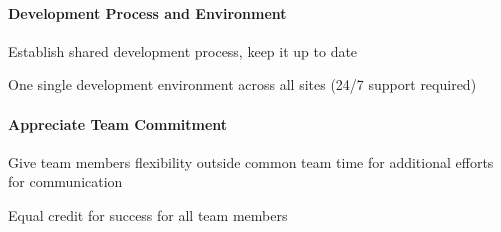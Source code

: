 \paragraph{Development Process and Environment}
\begin{description}[itemsep=0pt]
  \item[Living Process] Establish shared development process, keep it up to date
  \item[Common Development Environment] One single development environment across all sites (24/7 support required)
\end{description}
\paragraph{Appreciate Team Commitment}
\begin{description}[itemsep=0pt]
  \item[Flexibility] Give team members flexibility outside common team time for additional efforts for communication
  \item[Full Credit] Equal credit for success for all team members
\end{description}

\newpage
